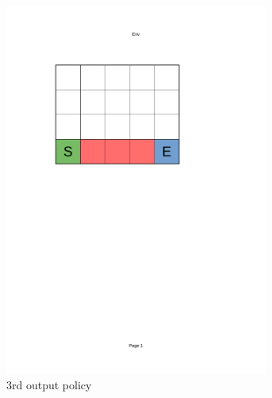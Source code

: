 \begin{figure}[!ht]
\begin{subfigure}{0.24\textwidth}
            \includegraphics[page=9, trim = 40mm 160mm 70mm 45mm, clip, width=0.95\textwidth]{figures/personal_work/policies.pdf}
        \caption{3rd output policy}
    \end{subfigure}
    \begin{subfigure}{0.24\textwidth}
        \centering

\end{subfigure}
\end{figure}
